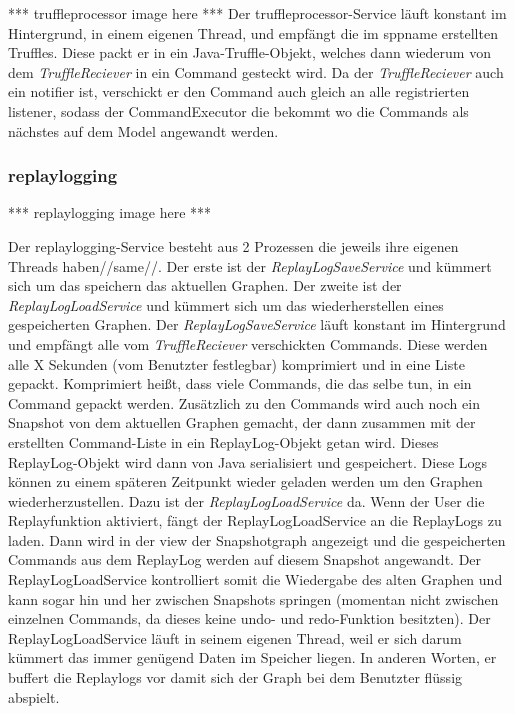     *** truffleprocessor image here ***
    \newline
    \newline
    Der truffleprocessor-Service läuft konstant im Hintergrund, in einem eigenen Thread,
    und empfängt die im \gls{sppname} erstellten Truffles.
    Diese packt er in ein Java-Truffle-Objekt, welches dann wiederum von dem
    \textit{TruffleReciever} in ein Command gesteckt wird. Da der \textit{TruffleReciever}
    auch ein \gls{notifier} ist, verschickt er den Command auch gleich an
    alle registrierten \gls{listener}, sodass der CommandExecutor die bekommt wo die Commands
    als nächstes auf dem Model angewandt werden.

    \subsubsection{replaylogging}
    \label{subsubsec:replaylogging}

    *** replaylogging image here ***
    \newline
    \newline

    Der replaylogging-Service besteht aus 2 Prozessen die jeweils ihre eigenen Threads haben//same//.
    Der erste ist der \textit{ReplayLogSaveService} und kümmert sich um das speichern das aktuellen
    Graphen. Der zweite ist der \textit{ReplayLogLoadService} und kümmert sich um das
    wiederherstellen eines gespeicherten Graphen.
    \newline
    \newline
    Der \textit{ReplayLogSaveService} läuft konstant im Hintergrund und empfängt alle
    vom \textit{TruffleReciever} verschickten Commands. Diese werden alle X
    Sekunden (vom Benutzter festlegbar) komprimiert und in eine Liste gepackt.
    Komprimiert heißt, dass viele Commands, die das selbe tun, in ein Command
    gepackt werden. Zusätzlich zu den Commands wird auch noch ein Snapshot
    von dem aktuellen Graphen gemacht, der dann zusammen mit der erstellten
    Command-Liste in ein ReplayLog-Objekt getan wird. Dieses
    ReplayLog-Objekt wird dann von Java serialisiert und gespeichert.
    \newline
    \newline
    Diese Logs können zu einem späteren Zeitpunkt wieder geladen werden um den
    Graphen wiederherzustellen. Dazu ist der \textit{ReplayLogLoadService} da. Wenn
    der User die Replayfunktion aktiviert, fängt der ReplayLogLoadService an die
    ReplayLogs zu laden. Dann wird in der view der Snapshotgraph angezeigt
    und die gespeicherten Commands aus dem ReplayLog werden auf
    diesem Snapshot angewandt. Der ReplayLogLoadService kontrolliert somit die
    Wiedergabe des alten Graphen und kann sogar hin und her zwischen Snapshots
    springen (momentan nicht zwischen einzelnen Commands, da dieses keine undo-
    und redo-Funktion besitzten).
    \newline
    \newline
    Der ReplayLogLoadService läuft in seinem eigenen Thread, weil er sich darum
    kümmert das immer genügend Daten im Speicher liegen. In anderen Worten, er
    buffert die Replaylogs vor damit sich der Graph bei dem Benutzter flüssig
    abspielt.

